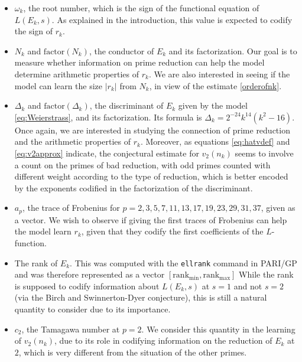 \documentclass[12pt]{amsart}%
\newcommand{\1}{\mathds{1}}
\theoremstyle{definition}
\numberwithin{equation}{section}
\numberwithin{table}{section}
\numberwithin{figure}{section}
\begin{document}
\begin{itemize}
\item $\omega_k$, the root number, which is the sign of the functional equation
of $L(E_k,s)$. As explained in the introduction, this value is expected to codify the sign of $r_k$.


\item $N_k$ and $\text{factor}(N_k)$, the conductor of $E_k$ and its factorization. Our goal is to measure whether information on  prime reduction can help the model determine arithmetic properties of $r_k$. We are also interested in seeing if the model can learn the size $|r_k|$ from $N_k$, in view of the estimate \eqref{orderofnk}.


\item $\Delta_k$ and $\text{factor}(\Delta_k)$, the  discriminant of $E_k$ given by the model \eqref{eq:Weierstrass}, and its factorization. Its formula is $\Delta_k=2^{-24}k^{14}(k^2-16)$. Once again, we are interested in studying the connection of prime reduction and the arithmetic properties of $r_k$. Moreover, as equations \eqref{eq:hatvdef} and \eqref{eq:v2approx} indicate, the conjectural estimate for $v_2(n_k)$ seems to involve a count on the primes of bad reduction, with odd primes counted with different weight according to the type of reduction, which is better encoded by the exponents codified in the factorization of the discriminant.

\item $a_p$, the trace of Frobenius for $p=2, 3, 5,
7, 11, 13, 17, 19, 23, 29, 31, 37$, given as a vector. We wish to observe if giving the first traces of Frobenius can help the model learn $r_k$, given that they codify the first coefficients of the $L$-function.

\item The rank of $E_k$. This was computed with the \texttt{ellrank} command in \textsc{PARI/GP} \cite{PARI} and was therefore   represented as a vector $[\mathrm{rank}_{\min{}},\mathrm{rank}_{\max{}}]$%
While the rank is supposed to codify information about $L(E_k,s)$ at $s=1$ and not $s=2$ (via the Birch and Swinnerton-Dyer conjecture), this is still a natural quantity to consider due to its importance.

\item $c_2$, the Tamagawa number at $p=2$. We consider this quantity in the learning of $v_2(n_k)$, due to its role in codifying information on the reduction of $E_k$ at $2$, which is very different from the situation of the other primes.


\end{itemize}
\end{document}
